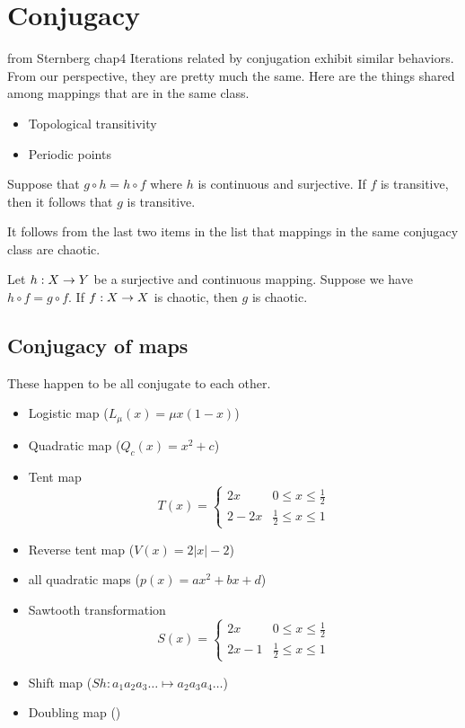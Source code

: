 \documentclass[12pt]{book}
\begin{document}
\section{Conjugacy}
from Sternberg chap4
Iterations related by conjugation exhibit similar behaviors. From our perspective, they are pretty much the same.
Here are the things shared among mappings that are in the same class.
\begin{itemize}
  \item Topological transitivity
  \item Periodic points
\end{itemize}
\begin{proposition}
  Suppose that $g\circ h = h\circ f$ where $h$ is continuous and surjective. If $f$ is transitive,
  then it follows that $g$ is transitive.
\end{proposition}

It follows from the last two items in the list that mappings in the same conjugacy class are chaotic.
\begin{proposition}
  Let $h: X\rightarrow Y$ be a surjective and continuous mapping. Suppose we have $h\circ f = g\circ f$. If $f: X\rightarrow X$ is chaotic,
  then $g$ is chaotic.
\end{proposition}

\subsection{Conjugacy of maps}
These happen to be all conjugate to each other.
\begin{itemize}
  \item Logistic map ($L_\mu(x) = \mu x(1-x)$)
  \item Quadratic map ($Q_c(x) = x^2 + c$)
  \item Tent map 
    \begin{equation*}
      T(x) = 
      \begin{cases}
        2x & 0 \leq x \leq \frac{1}{2}      \\
        2 - 2x & \frac{1}{2} \leq x \leq 1
      \end{cases}
    \end{equation*}
  \item Reverse tent map ($V(x) = 2|x| - 2$)
  \item all quadratic maps ($p(x) = ax^2 + bx + d$)
  \item Sawtooth transformation 
    \begin{equation*}
      S(x) = 
      \begin{cases}
        2x     & 0 \leq x \leq \frac{1}{2}      \\
        2x - 1 & \frac{1}{2} \leq x \leq 1
      \end{cases}
    \end{equation*}
  \item Shift map ($Sh: a_1a_2a_3\ldots \mapsto a_2a_3a_4\ldots$)
  \item Doubling map ()
\end{itemize}
\end{document}
